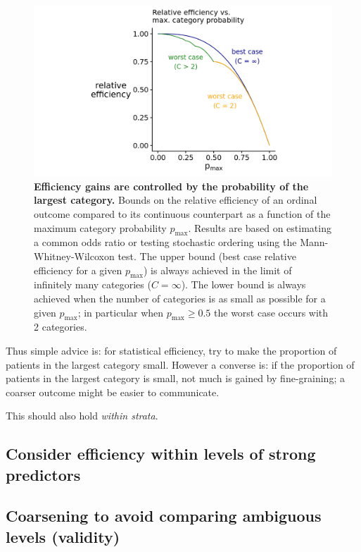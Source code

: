 \documentclass[
  11pt,
  fleqn
]{article}
\begin{document}
\begin{figure}
  \includegraphics[width=6in]{p_max_controls_efficiency.png}
  \caption{\textbf{Efficiency gains are controlled by the probability
    of the largest category.} Bounds on the relative efficiency of an
    ordinal outcome
    compared to its continuous counterpart as a function of the maximum
    category probability $p_\text{max}$. Results are based on
    estimating a common odds ratio or testing stochastic ordering
    using the Mann-Whitney-Wilcoxon test. The upper bound (best case
    relative efficiency for a given $p_\text{max}$) is always
    achieved in the
    limit of infinitely many categories ($C = \infty$). The lower bound
    is always achieved when the number of categories is as small as
    possible for a given $p_\text{max}$; in particular when
  $p_\text{max} \geq 0.5$ the worst case occurs with 2 categories.}
  \label{fig:p_max}
\end{figure}

Thus simple advice is: for statistical efficiency, try to make
the proportion
of patients in the largest category small. However a converse is: if the
proportion of patients in the largest category is small, not much
is gained by
fine-graining; a coarser outcome might be easier to communicate.

This should also hold \emph{within strata}.

\subsection{Consider efficiency within levels of strong predictors}

\subsection{Coarsening to avoid comparing ambiguous levels (validity)}
\end{document}
